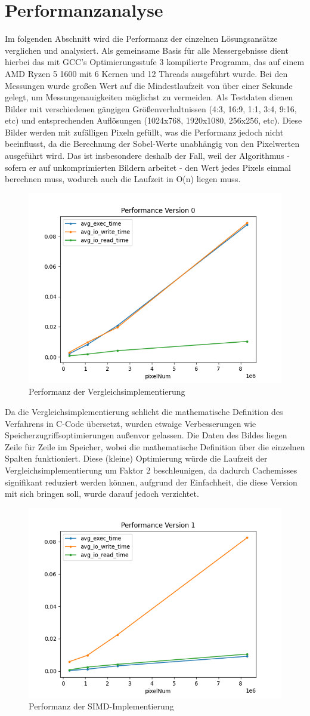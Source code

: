 \documentclass[course=erap]{aspdoc}
\begin{document}
\section{Performanzanalyse}
Im folgenden Abschnitt wird die Performanz der einzelnen Lösungsansätze verglichen und analysiert.
Als gemeinsame Basis für alle Messergebnisse dient hierbei das mit GCC's Optimierungsstufe 3 kompilierte Programm, das auf einem AMD Ryzen 5 1600 mit 6 Kernen und 12 Threads ausgeführt wurde.
Bei den Messungen wurde großen Wert auf die Mindestlaufzeit von über einer Sekunde gelegt, um Messungenauigkeiten möglichst zu vermeiden.
Als Testdaten dienen Bilder mit verschiedenen gängigen Größenverhaltnissen (4:3, 16:9, 1:1, 3:4, 9:16, etc) und entsprechenden Auflösungen (1024x768, 1920x1080, 256x256, etc).
Diese Bilder werden mit zufälligen Pixeln gefüllt, was die Performanz jedoch nicht beeinflusst, da die Berechnung der Sobel-Werte unabhängig von den Pixelwerten ausgeführt wird.
Das ist insbesondere deshalb der Fall, weil der Algorithmus - sofern er auf unkomprimierten Bildern arbeitet - den Wert jedes Pixels einmal berechnen muss, wodurch auch die Laufzeit in O(n) liegen muss.
\begin{figure}[H]
    \centering
    \includegraphics[width=0.5\columnwidth]{graphics/performance_vergleich}
    \caption{Performanz der Vergleichsimplementierung}
    \label{fig:performanz}
\end{figure}
Da die Vergleichsimplementierung schlicht die mathematische Definition des Verfahrens in C-Code übersetzt, wurden etwaige Verbesserungen wie Speicherzugriffsoptimierungen außenvor gelassen.
Die Daten des Bildes liegen Zeile für Zeile im Speicher, wobei die mathematische Definition über die einzelnen Spalten funktioniert.
Diese (kleine) Optimierung würde die Laufzeit der Vergleichsimplementierung um Faktor 2 beschleunigen, da dadurch Cachemisses signifikant reduziert werden können, aufgrund der Einfachheit, die diese Version mit sich bringen soll, wurde darauf jedoch verzichtet.
\begin{figure}[H]
    \centering
    \includegraphics[width=0.5\columnwidth]{graphics/performance_simd}
    \caption{Performanz der SIMD-Implementierung}
    \label{fig:performanz-simd}
\end{figure}
\end{document}
